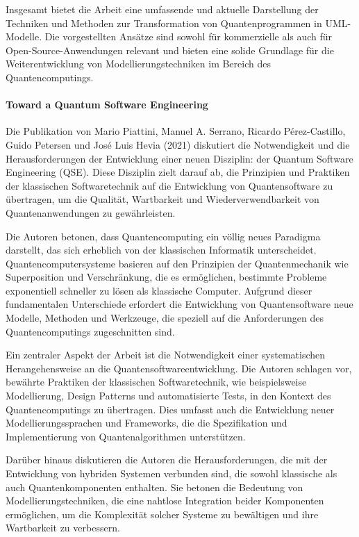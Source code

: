 Insgesamt bietet die Arbeit eine umfassende und aktuelle Darstellung der Techniken und Methoden zur Transformation von 
Quantenprogrammen in UML-Modelle. Die vorgestellten Ansätze sind sowohl für kommerzielle als auch für Open-Source-Anwendungen 
relevant und bieten eine solide Grundlage für die Weiterentwicklung von Modellierungstechniken im Bereich des Quantencomputings.

\paragraph{Toward a Quantum Software Engineering}

Die Publikation von Mario Piattini, Manuel A. Serrano, Ricardo Pérez-Castillo, Guido Petersen und José Luis Hevia (2021) \cite{Piattini_2021} 
diskutiert die Notwendigkeit und die Herausforderungen der Entwicklung einer neuen Disziplin: der Quantum Software 
Engineering (QSE). Diese Disziplin zielt darauf ab, die Prinzipien und Praktiken der klassischen Softwaretechnik 
auf die Entwicklung von Quantensoftware zu übertragen, um die Qualität, Wartbarkeit und Wiederverwendbarkeit von 
Quantenanwendungen zu gewährleisten.

Die Autoren betonen, dass Quantencomputing ein völlig neues Paradigma darstellt, das sich erheblich von der 
klassischen Informatik unterscheidet. Quantencomputersysteme basieren auf den Prinzipien der Quantenmechanik 
wie Superposition und Verschränkung, die es ermöglichen, bestimmte Probleme exponentiell schneller zu lösen als 
klassische Computer. Aufgrund dieser fundamentalen Unterschiede erfordert die Entwicklung von Quantensoftware neue 
Modelle, Methoden und Werkzeuge, die speziell auf die Anforderungen des Quantencomputings zugeschnitten sind.

Ein zentraler Aspekt der Arbeit ist die Notwendigkeit einer systematischen Herangehensweise an die 
Quantensoftwareentwicklung. Die Autoren schlagen vor, bewährte Praktiken der klassischen Softwaretechnik, wie 
beispielsweise Modellierung, Design Patterns und automatisierte Tests, in den Kontext des Quantencomputings zu 
übertragen. Dies umfasst auch die Entwicklung neuer Modellierungssprachen und Frameworks, die die Spezifikation 
und Implementierung von Quantenalgorithmen unterstützen.

Darüber hinaus diskutieren die Autoren die Herausforderungen, die mit der Entwicklung von hybriden Systemen verbunden 
sind, die sowohl klassische als auch Quantenkomponenten enthalten. Sie betonen die Bedeutung von Modellierungstechniken, 
die eine nahtlose Integration beider Komponenten ermöglichen, um die Komplexität solcher Systeme zu bewältigen und 
ihre Wartbarkeit zu verbessern.

